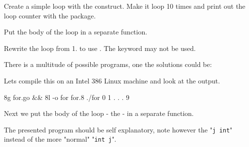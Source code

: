 \begin{Exercise}[title={For-loop},difficulty=1]
\label{ex:for-loop}
\Question \label{ex:for-loop q1} Create a simple loop with the  construct. Make it loop
10 times and print out the loop counter with the  package.

\Question \label{ex:for-loop q2} Put the body of the loop in a separate function.

\Question \label{ex:for-loop q3} Rewrite the loop from 1. to use . The
keyword  may not be used.
\end{Exercise}

\begin{Answer}

\Question There is a multitude of possible programs, 
one the solutions could be:

Lets compile this on an Intel 386 Linux machine and look at the
output.
\begin{display}
\pr 8g for.go && 8l -o for for.8
\pr ./for
0
1
.
.
.
9
\end{display}

\Question Next we put the body of the 
loop - the  - in a separate function.

The presented program should be self explanatory, note however the
"\lstinline{j int}" instead of the more "normal" "\lstinline{int j}".
\end{Answer}
